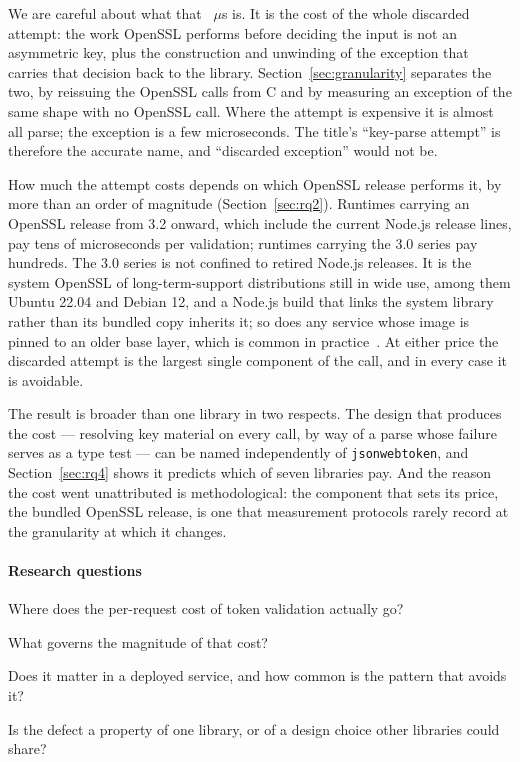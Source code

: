 \documentclass[pdflatex,sn-basic,twocolumn]{sn-jnl}%
\newcommand{\LibraryName}{\texttt{jsonwebtoken}}
\begin{document}
We are careful about what that \HostProbeThrows~$\mu$s is. It is the cost of
the whole discarded attempt: the work OpenSSL performs before deciding the
input is not an asymmetric key, plus the construction and unwinding of the
exception that carries that decision back to the library.
Section~\ref{sec:granularity} separates the two, by reissuing the OpenSSL calls
from C and by measuring an exception of the same shape with no OpenSSL call.
Where the attempt is expensive it is almost all parse; the exception is a few
microseconds. The title's ``key-parse attempt'' is therefore the accurate
name, and ``discarded exception'' would not be.

How much the attempt costs depends on which OpenSSL release performs it, by more
than an order of magnitude (Section~\ref{sec:rq2}). Runtimes carrying an OpenSSL
release from 3.2 onward, which include the current Node.js release lines, pay
tens of microseconds per validation; runtimes carrying the 3.0 series pay
hundreds. The 3.0 series is not confined to retired Node.js releases. It is the
system OpenSSL of long-term-support distributions still in wide use, among them
Ubuntu 22.04 and Debian 12, and a Node.js build that links the system library
rather than its bundled copy inherits it; so does any service whose image is
pinned to an older base layer, which is common in
practice~\citep{zerouali2019outdated}. At either price the discarded attempt is
the largest single component of the call, and in every case it is avoidable.

The result is broader than one library in two respects. The design that
produces the cost --- resolving key material on every call, by way of a parse
whose failure serves as a type test --- can be named independently of
\LibraryName{}, and Section~\ref{sec:rq4} shows it predicts which of seven
libraries pay. And the reason the cost went unattributed is methodological: the
component that sets its price, the bundled OpenSSL release, is one that
measurement protocols rarely record at the granularity at which it changes.

\paragraph{Research questions}
\begin{list}{}{\setlength{\labelwidth}{2.2em}\setlength{\labelsep}{0.5em}%
  \setlength{\leftmargin}{2.7em}\setlength{\itemsep}{1pt}\setlength{\topsep}{2pt}%
  \setlength{\parsep}{0pt}\renewcommand{\makelabel}[1]{\textbf{#1}\hfill}}
\item[RQ1] Where does the per-request cost of token validation actually go?
\item[RQ2] What governs the magnitude of that cost?
\item[RQ3] Does it matter in a deployed service, and how common is the
  pattern that avoids it?
\item[RQ4] Is the defect a property of one library, or of a design choice
  other libraries could share?
\end{list}
\end{document}

